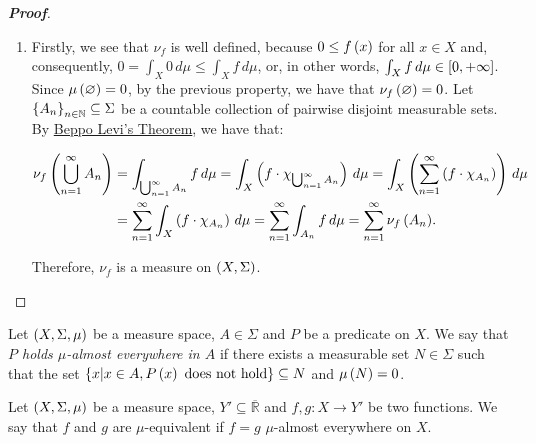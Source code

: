 \begin{proposition}
\begin{proof}[\rm\textbf{Proof}]
\begin{enumerate}
      \item Firstly, we see that $\nu_f$ is well defined, because $0\leq f\left(x\right)$ for all $x\in X$ and, consequently, $0=\int_{X}{0\,d\mu}\leq\int_{X}{f\,d\mu}$, or, in other words, $\int_{X}{f\,d\mu}\in\left[0,+\infty\right]$. Since $\mu\left(\varnothing\right)=0$, by the previous property, we have that $\nu_f\left(\varnothing\right)=0$. Let $\left\{A_n\right\}_{n\in\mathbb{N}}\subseteq\Sigma$ be a countable collection of pairwise disjoint measurable sets. By \hyperref[Beppo Levi's Theorem]{Beppo Levi's Theorem}, we have that:
      
      \begin{equation}
        \begin{split}
          \nu_f\left(\bigcup_{n=1}^{\infty}{A_n}\right) &=\int_{\bigcup_{n=1}^{\infty}{A_n}}{f\,d\mu}=\int_{X}{\left(f\cdot\chi_{\bigcup_{n=1}^{\infty}{A_n}}\right)\,d\mu}=\int_{X}{\left(\sum_{n=1}^{\infty}{\left(f\cdot\chi_{A_n}\right)}\right)\,d\mu}\\
          & =\sum_{n=1}^{\infty}{\int_{X}{\left(f\cdot\chi_{A_n}\right)\,d\mu}}=\sum_{n=1}^{\infty}{\int_{A_n}{f\,d\mu}}=\sum_{n=1}^{\infty}{\nu_f\left(A_n\right)}.
        \end{split}
      \end{equation}

      Therefore, $\nu_f$ is a measure on $\left(X,\Sigma\right)$.
    \end{enumerate}
  \end{proof}
\end{proposition}

\begin{definition}
  Let $\left(X,\Sigma,\mu\right)$ be a measure space, $A\in\Sigma$ and $P$ be a predicate on $X$. We say that \emph{$P$ holds $\mu$-almost everywhere in $A$} if there exists a measurable set $N\in\Sigma$ such that the set $\left\{x\middle|x\in A,P\left(x\right)\text{ does not hold}\right\}\subseteq N$ and $\mu\left(N\right)=0$.
\end{definition}

\begin{definition}
  Let $\left(X,\Sigma,\mu\right)$ be a measure space, $Y'\subseteq\overline{\mathbb{R}}$ and $f,g:X\rightarrow Y'$ be two functions. We say that $f$ and $g$ are $\mu$-equivalent if $f=g$ $\mu$-almost everywhere on $X$.
\end{definition}

